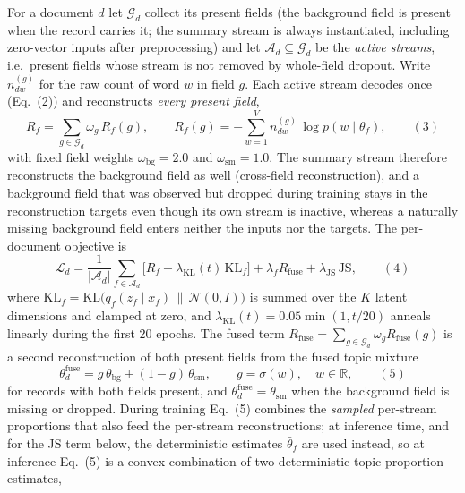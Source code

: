 \documentclass{article}
\begin{document}
For a document $d$ let $\mathcal{G}_d$ collect its present fields (the background field is present
when the record carries it; the summary stream is always instantiated, including zero-vector
inputs after preprocessing) and let
$\mathcal{A}_d\subseteq\mathcal{G}_d$ be the \emph{active streams}, i.e.\ present fields whose
stream is not removed by whole-field dropout. Write $n^{(g)}_{dw}$ for the raw count of word $w$
in field $g$. Each active stream decodes once (Eq.~(2)) and reconstructs
\emph{every present field},
\begin{equation}
R_f=\sum_{g\in\mathcal{G}_d}\omega_g\,R_f(g),\qquad
R_f(g)=-\sum_{w=1}^{V} n^{(g)}_{dw}\,\log p\!\left(w\mid\theta_f\right),
\label{eq:recon}
\qquad(3)\end{equation}
with fixed field weights $\omega_{\mathrm{bg}}=2.0$ and $\omega_{\mathrm{sm}}=1.0$. The summary
stream therefore reconstructs the background field as well (cross-field reconstruction), and a
background field that was observed but dropped during training stays in the reconstruction
targets even though its own stream is inactive, whereas a naturally missing background field
enters neither the inputs nor the targets. The per-document objective is
\begin{equation}
\mathcal{L}_d=\frac{1}{|\mathcal{A}_d|}\sum_{f\in\mathcal{A}_d}
\Big[R_f+\lambda_{\mathrm{KL}}(t)\,\mathrm{KL}_f\Big]
+\lambda_f R_{\mathrm{fuse}}+\lambda_{\mathrm{JS}}\,\mathrm{JS},
\label{eq:total}
\qquad(4)\end{equation}
where $\mathrm{KL}_f=\mathrm{KL}\big(q_f(z_f\mid x_f)\,\|\,\mathcal N(0,I)\big)$ is summed over
the $K$ latent dimensions and clamped at zero, and $\lambda_{\mathrm{KL}}(t)=0.05\min(1,t/20)$
anneals linearly during the first 20 epochs. The fused term
$R_{\mathrm{fuse}}=\sum_{g\in\mathcal{G}_d}\omega_g R_{\mathrm{fuse}}(g)$ is a second
reconstruction of both present fields from the fused topic mixture
\begin{equation}
\theta_d^{\mathrm{fuse}}=g\,\theta_{\mathrm{bg}}+(1-g)\,\theta_{\mathrm{sm}},
\qquad g=\sigma(w),\quad w\in\mathbb{R},
\label{eq:lfuse}
\qquad(5)\end{equation}
for records with both fields present, and
$\theta_d^{\mathrm{fuse}}=\theta_{\mathrm{sm}}$ when the background field is missing or
dropped. During training Eq.~(5) combines the \emph{sampled} per-stream
proportions that also feed the per-stream reconstructions; at inference time, and for the JS
term below, the deterministic estimates $\bar\theta_f$ are used instead, so at inference
Eq.~(5) is a convex combination of two deterministic topic-proportion estimates,
\end{document}
